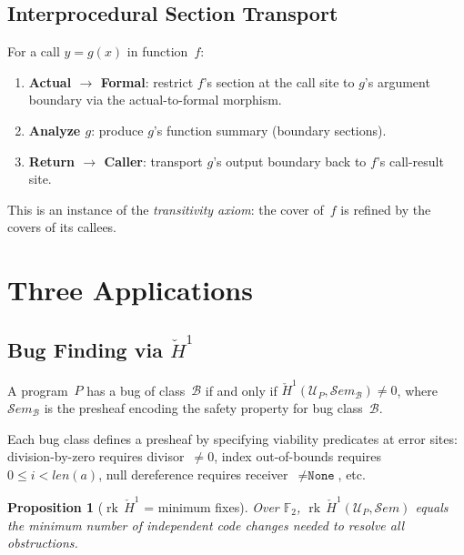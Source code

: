 \documentclass[acmsmall,screen]{acmart}
\newtheorem{proposition}{Proposition}
\theoremstyle{remark}
\newcommand{\Sem}{\mathcal{S}\mathit{em}}
\newcommand{\Hc}[1]{\check{H}^{#1}}
\newcommand{\rk}{\operatorname{rk}}
\newcommand{\GF}{\mathbb{F}}
\begin{document}
\subsection{Interprocedural Section Transport}\label{sec:interprocedural}

For a call $y = g(x)$ in function~$f$:
\begin{enumerate}[nosep]
  \item \textbf{Actual $\to$ Formal}: restrict $f$'s section at the call
    site to $g$'s argument boundary via the actual-to-formal morphism.
  \item \textbf{Analyze $g$}: produce $g$'s function summary (boundary
    sections).
  \item \textbf{Return $\to$ Caller}: transport $g$'s output boundary
    back to $f$'s call-result site.
\end{enumerate}
This is an instance of the \emph{transitivity axiom}: the cover of~$f$
is refined by the covers of its callees.

\section{Three Applications}\label{sec:applications}

\subsection{Bug Finding via $\Hc{1}$}\label{sec:bugs}

\begin{theorem}\label{thm:bugs}
A program~$P$ has a bug of class~$\mathcal{B}$ if and only if
$\Hc{1}(\mathcal{U}_P, \Sem_{\mathcal{B}}) \neq 0$, where
$\Sem_{\mathcal{B}}$ is the presheaf encoding the safety property
for bug class~$\mathcal{B}$.
\end{theorem}

Each bug class defines a presheaf by specifying viability predicates at
error sites: division-by-zero requires divisor~$\neq 0$, index
out-of-bounds requires $0 \leq i < \mathit{len}(a)$, null dereference
requires receiver~$\neq \texttt{None}$, etc.

\begin{proposition}[$\rk\,\Hc{1}$ = minimum fixes]\label{prop:rank-h1}
Over $\GF_2$, $\rk\,\Hc{1}(\mathcal{U}_P, \Sem)$ equals the minimum
number of independent code changes needed to resolve all obstructions.
\end{proposition}
\end{document}
